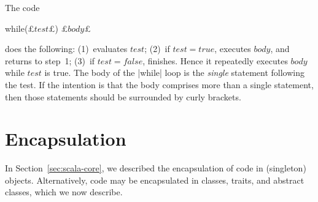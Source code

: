 The code 
\begin{scala}
  while(£$test$£) £$body$£
\end{scala} 
does the following: (1)~evaluates $test$; (2)~if $test = true$, executes
$body$, and returns to step~1; (3)~if $test = false$, finishes.
Hence it repeatedly executes $body$ while $test$ is true. 
%
The body of the |while| loop is the \emph{single} statement following the
test.  If the intention is that the body comprises more than a single
statement, then those statements should be surrounded by curly brackets.






\section{Encapsulation}
\label{sec:scala-encapsulation}

In Section~\ref{sec:scala-core}, we described the encapsulation of code in
(singleton) objects.  Alternatively, code may be encapsulated in classes,
traits, and abstract classes, which we now describe.


